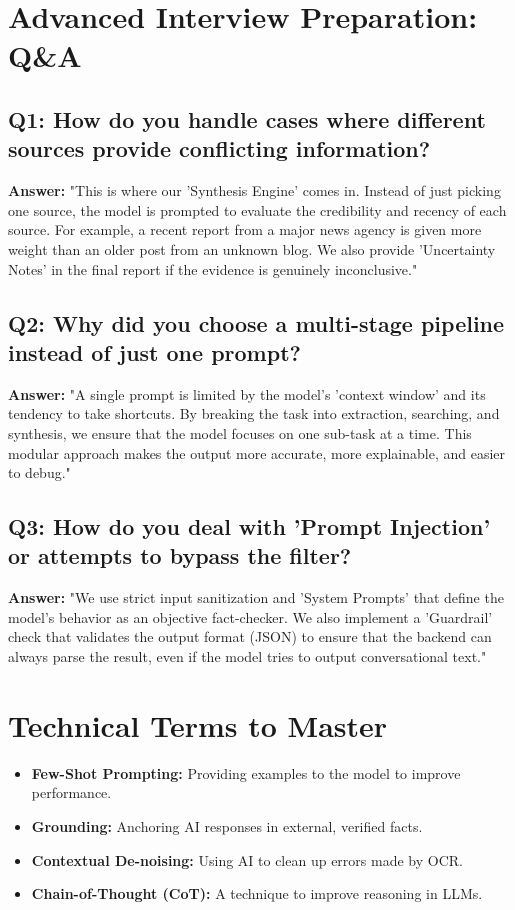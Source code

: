 \documentclass[12pt]{article}
\begin{document}
\section{Advanced Interview Preparation: Q&A}

\subsection{Q1: How do you handle cases where different sources provide conflicting information?}
\textbf{Answer:} "This is where our 'Synthesis Engine' comes in. Instead of just picking one source, the model is prompted to evaluate the credibility and recency of each source. For example, a recent report from a major news agency is given more weight than an older post from an unknown blog. We also provide 'Uncertainty Notes' in the final report if the evidence is genuinely inconclusive."

\subsection{Q2: Why did you choose a multi-stage pipeline instead of just one prompt?}
\textbf{Answer:} "A single prompt is limited by the model's 'context window' and its tendency to take shortcuts. By breaking the task into extraction, searching, and synthesis, we ensure that the model focuses on one sub-task at a time. This modular approach makes the output more accurate, more explainable, and easier to debug."

\subsection{Q3: How do you deal with 'Prompt Injection' or attempts to bypass the filter?}
\textbf{Answer:} "We use strict input sanitization and 'System Prompts' that define the model's behavior as an objective fact-checker. We also implement a 'Guardrail' check that validates the output format (JSON) to ensure that the backend can always parse the result, even if the model tries to output conversational text."

\section{Technical Terms to Master}
\begin{itemize}
    \item \textbf{Few-Shot Prompting:} Providing examples to the model to improve performance.
    \item \textbf{Grounding:} Anchoring AI responses in external, verified facts.
    \item \textbf{Contextual De-noising:} Using AI to clean up errors made by OCR.
    \item \textbf{Chain-of-Thought (CoT):} A technique to improve reasoning in LLMs.
\end{itemize}
\end{document}
